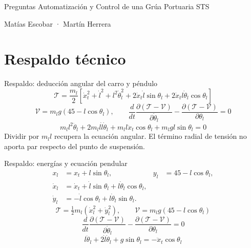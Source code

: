 \documentclass[aspectratio=169,11pt]{beamer}
\begin{document}
\begin{frame}[t,label=slide91]{Preguntas}
\vfill\textcolor{accent}{\Large Automatización y Control de una Grúa Portuaria STS}\par\vspace{5mm}Matías Escobar · Martín Herrera\par\vfill
{}
\end{frame}
\appendix{}
\section{Respaldo técnico}
\begin{frame}[t,label=pendulodeduccion]{Respaldo: deducción angular del carro y péndulo}
\relax
{\small
\[
\mathcal T=\frac{m_l}{2}\left[\dot x_t^2+\dot l^2+l^2\dot\theta_l^2
+2\dot x_t\dot l\sin\theta_l+2\dot x_tl\dot\theta_l\cos\theta_l\right]
\]
\[
\mathcal V=m_lg(45-l\cos\theta_l),\qquad
\frac{d}{dt}\frac{\partial(\mathcal T-\mathcal V)}{\partial\dot\theta_l}
-\frac{\partial(\mathcal T-\mathcal V)}{\partial\theta_l}=0
\]
\[
m_ll^2\ddot\theta_l+2m_ll\dot l\dot\theta_l
+m_ll\ddot x_t\cos\theta_l+m_lgl\sin\theta_l=0
\]
}
Dividir por $m_ll$ recupera la ecuación angular. El término radial de tensión no aporta par respecto del punto de suspensión.
\end{frame}
\begin{frame}[t,label=slide92]{Respaldo: energías y ecuación pendular}
\[
\begin{aligned}x_l&=x_t+l\sin\theta_l,&y_l&=45-l\cos\theta_l,\\\dot x_l&=\dot x_t+\dot l\sin\theta_l+l\dot\theta_l\cos\theta_l,\\\dot y_l&=-\dot l\cos\theta_l+l\dot\theta_l\sin\theta_l.\end{aligned}
\]
\[
\mathcal T=\tfrac12m_l(\dot x_l^2+\dot y_l^2),\qquad \mathcal V=m_lg(45-l\cos\theta_l)
\]
\[
\frac{d}{dt}\frac{\partial(\mathcal T-\mathcal V)}{\partial\dot\theta_l}-\frac{\partial(\mathcal T-\mathcal V)}{\partial\theta_l}=0
\]
\[
l\ddot\theta_l+2\dot l\dot\theta_l+g\sin\theta_l=-\ddot x_t\cos\theta_l
\]

\end{frame}
\end{document}
